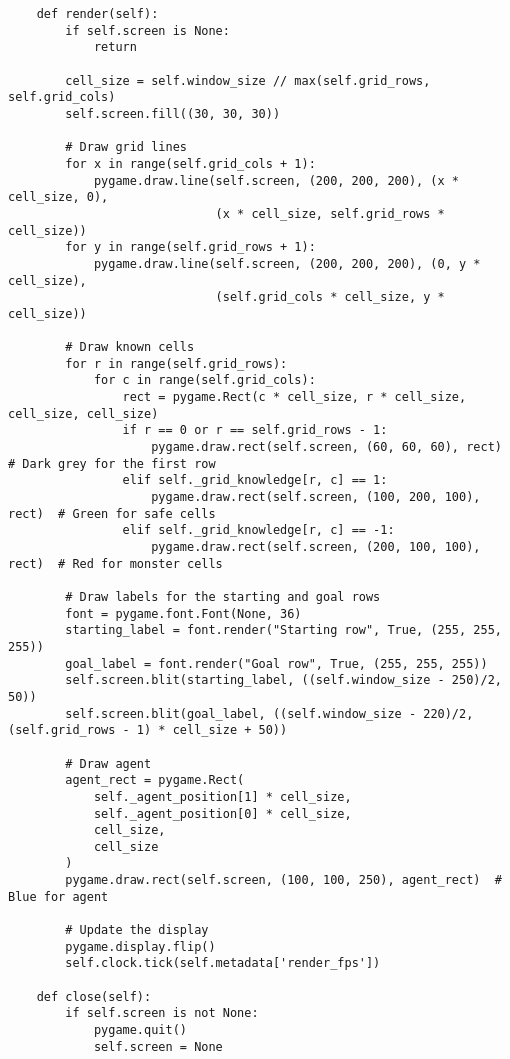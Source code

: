 \begin{lstlisting}
    def render(self):
        if self.screen is None:
            return

        cell_size = self.window_size // max(self.grid_rows, self.grid_cols)
        self.screen.fill((30, 30, 30)) 

        # Draw grid lines
        for x in range(self.grid_cols + 1):
            pygame.draw.line(self.screen, (200, 200, 200), (x * cell_size, 0),
                             (x * cell_size, self.grid_rows * cell_size))
        for y in range(self.grid_rows + 1):
            pygame.draw.line(self.screen, (200, 200, 200), (0, y * cell_size),
                             (self.grid_cols * cell_size, y * cell_size))

        # Draw known cells
        for r in range(self.grid_rows):
            for c in range(self.grid_cols):
                rect = pygame.Rect(c * cell_size, r * cell_size, cell_size, cell_size)
                if r == 0 or r == self.grid_rows - 1:
                    pygame.draw.rect(self.screen, (60, 60, 60), rect)  # Dark grey for the first row
                elif self._grid_knowledge[r, c] == 1:
                    pygame.draw.rect(self.screen, (100, 200, 100), rect)  # Green for safe cells
                elif self._grid_knowledge[r, c] == -1:
                    pygame.draw.rect(self.screen, (200, 100, 100), rect)  # Red for monster cells

        # Draw labels for the starting and goal rows
        font = pygame.font.Font(None, 36)
        starting_label = font.render("Starting row", True, (255, 255, 255))
        goal_label = font.render("Goal row", True, (255, 255, 255))
        self.screen.blit(starting_label, ((self.window_size - 250)/2, 50))
        self.screen.blit(goal_label, ((self.window_size - 220)/2, (self.grid_rows - 1) * cell_size + 50))

        # Draw agent
        agent_rect = pygame.Rect(
            self._agent_position[1] * cell_size,
            self._agent_position[0] * cell_size,
            cell_size,
            cell_size
        )
        pygame.draw.rect(self.screen, (100, 100, 250), agent_rect)  # Blue for agent

        # Update the display
        pygame.display.flip()
        self.clock.tick(self.metadata['render_fps'])

    def close(self):
        if self.screen is not None:
            pygame.quit()
            self.screen = None
\end{lstlisting}


\newpage

